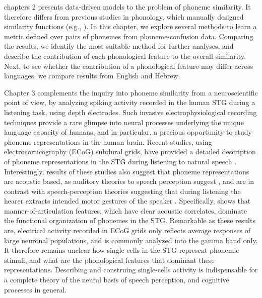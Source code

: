 chapters 2 presents data-driven models to the problem of phoneme similarity. It therefore differs from previous studies in phonology, which manually designed similarity functions (e.g., \citealp{Pierrehumbert1993, Frisch1997}). In this chapter, we explore several methods to learn a metric defined over pairs of phonemes from phoneme-confusion data. Comparing the results, we identify the most suitable method for further analyses, and describe the contribution of each phonological feature to the overall similarity. Next, to see whether the contribution of a phonological feature may differ across languages, we compare results from English and Hebrew. 

Chapter 3 complements the inquiry into phoneme similarity from a neuroscientific point of view, by analyzing spiking activity recorded in the human STG during a listening task, using depth electrodes. Such invasive electrophysiological recording techniques provide a rare glimpse into neural processes underlying the unique language capacity of humans, and in particular, a precious opportunity to study phoneme representations in the human brain. Recent studies, using electrocorticography (ECoG) subdural grids, have provided a detailed description of phoneme representations in the STG during listening to natural speech \citep{pasley2012reconstructing, Mesgarani2014}. Interestingly, results of these studies also suggest that phoneme representations are acoustic based, as auditory theories to speech perception suggest \citep{stevens1972quantal, stevens1989quantal}, and are in contrast with speech-perception theories suggesting that during listening the hearer extracts intended motor gestures of the speaker \citep{liberman1967perception, liberman1985motor}. Specifically, \citet{Mesgarani2014} shows that manner-of-articulation features, which have clear acoustic correlates, dominate the functional organization of phonemes in the STG. Remarkable as these results are, electrical activity recorded in ECoG grids only reflects average responses of large neuronal populations, and is commonly analyzed into the gamma band only. It therefore remains unclear how single cells in the STG represent phonemic stimuli, and what are the phonological features that dominant these representations. Describing and construing single-cells activity is indispensable for a complete theory of the neural basis of speech perception, and cognitive processes in general. 

